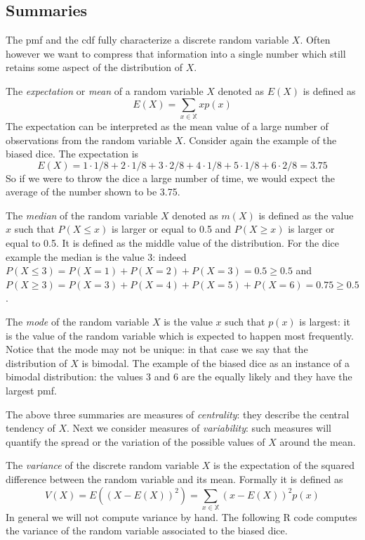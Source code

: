 \documentclass[
]{book}
\begin{document}
\hypertarget{summaries}{%
\subsection{Summaries}\label{summaries}}

The pmf and the cdf fully characterize a discrete random variable \(X\). Often however we want to compress that information into a single number which still retains some aspect of the distribution of \(X\).

The \emph{expectation} or \emph{mean} of a random variable \(X\) denoted as \(E(X)\) is defined as
\[
E(X)=\sum_{x\in\mathbb{X}}xp(x)
\]
The expectation can be interpreted as the mean value of a large number of observations from the random variable \(X\). Consider again the example of the biased dice. The expectation is
\[
E(X)=1\cdot1/8 + 2\cdot1/8 + 3\cdot 2/8 + 4\cdot 1/8 + 5\cdot 1/8 + 6\cdot 2/8 = 3.75
\]
So if we were to throw the dice a large number of time, we would expect the average of the number shown to be 3.75.

The \emph{median} of the random variable \(X\) denoted as \(m(X)\) is defined as the value \(x\) such that \(P(X\leq x)\) is larger or equal to 0.5 and \(P(X\geq x)\) is larger or equal to 0.5. It is defined as the middle value of the distribution. For the dice example the median is the value 3: indeed \(P(X\leq 3 ) = P(X=1)+P(X=2)+P(X=3)=0.5 \geq 0.5\) and \(P(X\geq 3) = P(X=3) + P(X=4) + P(X=5) + P(X=6) = 0.75 \geq 0.5\).

The \emph{mode} of the random variable \(X\) is the value \(x\) such that \(p(x)\) is largest: it is the value of the random variable which is expected to happen most frequently. Notice that the mode may not be unique: in that case we say that the distribution of \(X\) is bimodal. The example of the biased dice as an instance of a bimodal distribution: the values 3 and 6 are the equally likely and they have the largest pmf.

The above three summaries are measures of \emph{centrality}: they describe the central tendency of \(X\). Next we consider measures of \emph{variability}: such measures will quantify the spread or the variation of the possible values of \(X\) around the mean.

The \emph{variance} of the discrete random variable \(X\) is the expectation of the squared difference between the random variable and its mean. Formally it is defined as
\[
V(X)=E((X-E(X))^2)=\sum_{x\in\mathbb{X}}(x-E(X))^2p(x)
\]
In general we will not compute variance by hand. The following R code computes the variance of the random variable associated to the biased dice.
\end{document}
